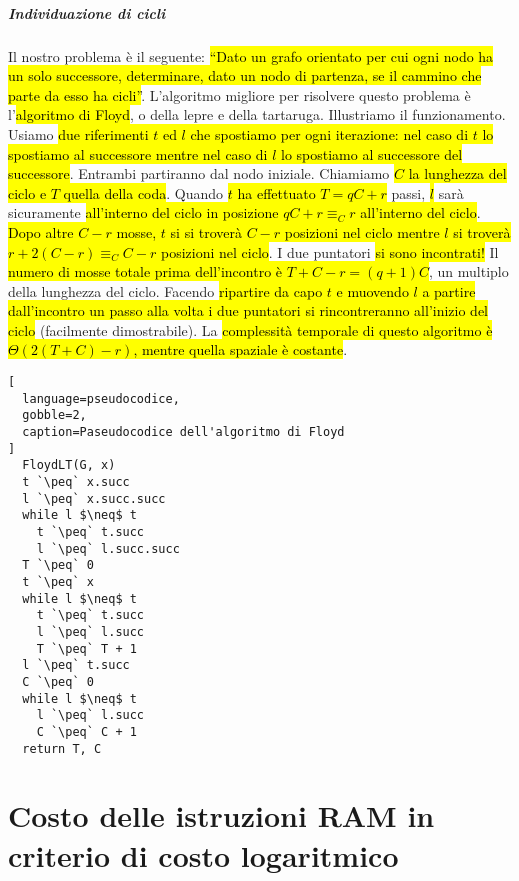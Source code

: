 \documentclass[a4paper,11pt,oneside]{article}
\theoremstyle{plain}
\theoremstyle{definition}
\theoremstyle{remark}
\newcommand{\peq}{$\gets$}
\begin{document}
\subparagraph{Individuazione di cicli} Il nostro problema è il seguente:
\hl{``Dato un grafo orientato per cui ogni nodo ha un solo successore,
determinare, dato un nodo di partenza, se il cammino che parte da esso ha
cicli''}. L'algoritmo migliore per risolvere questo problema è l'\hl{algoritmo
di Floyd}, o della lepre e della tartaruga. Illustriamo il funzionamento. Usiamo
\hl{due riferimenti $t$ ed $l$ che spostiamo per ogni iterazione: nel caso di
$t$ lo spostiamo al successore mentre nel caso di $l$ lo spostiamo al successore
del successore}. Entrambi partiranno dal nodo iniziale. Chiamiamo \hl{$C$ la
lunghezza del ciclo e $T$ quella della coda}. Quando \hl{$t$ ha effettuato $T =
qC + r$} passi, \hl{$l$} sarà sicuramente \hl{all'interno del ciclo in posizione
$qC + r \equiv_C r$ all'interno del ciclo}. \hl{Dopo altre $C-r$ mosse, $t$ si
si troverà $C-r$ posizioni nel ciclo mentre $l$ si troverà $r + 2(C-r) \equiv_C
C-r$ posizioni nel ciclo}. I due puntatori \hl{si sono incontrati!} Il
\hl{numero di mosse totale prima dell'incontro è $T+C-r=(q+1)C$}, un multiplo
della lunghezza del ciclo. Facendo \hl{ripartire da capo $t$ e muovendo $l$ a
partire dall'incontro un passo alla volta i due puntatori si rincontreranno
all'inizio del ciclo} (facilmente dimostrabile). La \hl{complessità temporale di
questo algoritmo è $\Theta(2(T+C)-r)$, mentre quella spaziale è costante}.

\begin{lstlisting}[
  language=pseudocodice,
  gobble=2,
  caption=Paseudocodice dell'algoritmo di Floyd
]
  FloydLT(G, x)
  t `\peq` x.succ
  l `\peq` x.succ.succ
  while l $\neq$ t
    t `\peq` t.succ
    l `\peq` l.succ.succ
  T `\peq` 0
  t `\peq` x
  while l $\neq$ t
    t `\peq` t.succ
    l `\peq` l.succ
    T `\peq` T + 1
  l `\peq` t.succ
  C `\peq` 0
  while l $\neq$ t
    l `\peq` l.succ
    C `\peq` C + 1
  return T, C
\end{lstlisting}

\appendix
\clearpage
\section{Costo delle istruzioni RAM in criterio di costo logaritmico}
\end{document}
